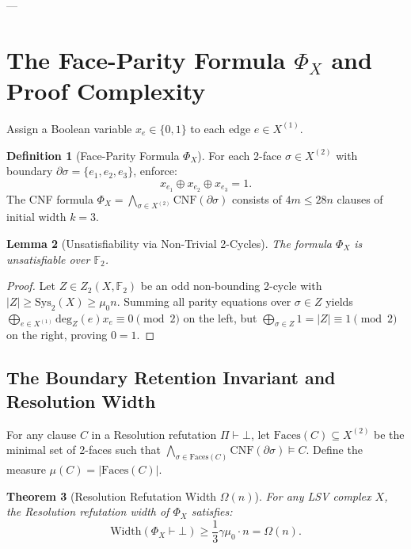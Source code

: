 \documentclass[11pt,a4paper]{article}
\theoremstyle{plain}
\newtheorem{theorem}{Theorem}[section]
\newtheorem{lemma}[theorem]{Lemma}
\theoremstyle{definition}
\newtheorem{definition}[theorem]{Definition}
\theoremstyle{remark}
\newcommand{\Width}{\mathrm{Width}}
\newcommand{\Faces}{\mathrm{Faces}}
\begin{document}
---

\section{The Face-Parity Formula $\Phi_X$ and Proof Complexity}

Assign a Boolean variable $x_e \in \{0, 1\}$ to each edge $e \in X^{(1)}$.

\begin{definition}[Face-Parity Formula $\Phi_X$]
For each 2-face $\sigma \in X^{(2)}$ with boundary $\partial \sigma = \{e_1, e_2, e_3\}$, enforce:
\[
x_{e_1} \oplus x_{e_2} \oplus x_{e_3} = 1.
\]
The CNF formula $\Phi_X = \bigwedge_{\sigma \in X^{(2)}} \mathrm{CNF}(\partial \sigma)$ consists of $4m \le 28n$ clauses of initial width $k = 3$.
\end{definition}

\begin{lemma}[Unsatisfiability via Non-Trivial 2-Cycles]
The formula $\Phi_X$ is unsatisfiable over $\mathbb{F}_2$.
\end{lemma}

\begin{proof}
Let $Z \in Z_2(X, \mathbb{F}_2)$ be an odd non-bounding 2-cycle with $|Z| \ge \mathrm{Sys}_2(X) \ge \mu_0 n$. Summing all parity equations over $\sigma \in Z$ yields $\bigoplus_{e \in X^{(1)}} \mathrm{deg}_Z(e) x_e \equiv 0 \pmod 2$ on the left, but $\bigoplus_{\sigma \in Z} 1 = |Z| \equiv 1 \pmod 2$ on the right, proving $0 = 1$.
\end{proof}

\subsection{The Boundary Retention Invariant and Resolution Width}

For any clause $C$ in a Resolution refutation $\Pi \vdash \bot$, let $\Faces(C) \subseteq X^{(2)}$ be the minimal set of 2-faces such that $\bigwedge_{\sigma \in \Faces(C)} \mathrm{CNF}(\partial \sigma) \models C$. Define the measure $\mu(C) = |\Faces(C)|$.

\begin{theorem}[Resolution Refutation Width $\Omega(n)$]\label{thm:width_bound}
For any LSV complex $X$, the Resolution refutation width of $\Phi_X$ satisfies:
\[
\Width(\Phi_X \vdash \bot) \ge \frac{1}{3} \gamma \mu_0 \cdot n = \Omega(n).
\]
\end{theorem}
\end{document}
